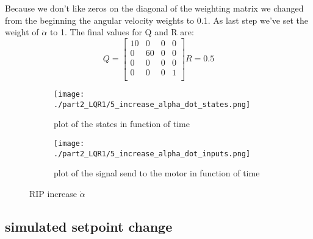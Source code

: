 Because we don't like zeros on the diagonal of the weighting matrix we changed from the beginning the angular velocity weights to 0.1. As last step we've set the weight of $\dot{\alpha}$ to 1. The final values for Q and R are:
$$
Q=\begin{bmatrix}
10 & 0 & 0 & 0 \\
0 & 60 & 0 & 0 \\
0 & 0 & 0 & 0 \\
0 & 0 & 0 & 1 \\
\end{bmatrix}
R=0.5
$$

\begin{figure}[H]
	\centering
	\begin{subfigure}[b]{0.45\textwidth}
		\texttt{[image: ./part2\_LQR1/5\_increase\_alpha\_dot\_states.png]}
		\caption{plot of the states in function of time}
	\end{subfigure}
	\begin{subfigure}[b]{0.45\textwidth}
		\texttt{[image: ./part2\_LQR1/5\_increase\_alpha\_dot\_inputs.png]}
		\caption{plot of the signal send to the motor in function of time}
	\end{subfigure}
	\caption{RIP increase $\dot{\alpha}$}
\end{figure}




\subsection{simulated setpoint change}